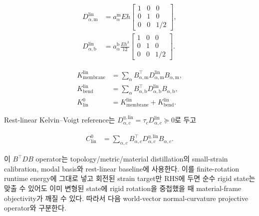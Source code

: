 \documentclass[11pt,a4paper]{article}
\begin{document}
\begin{equation}
\begin{aligned}
  D_{\alpha,\mathrm m}^{\mathrm{lin}}
  &=a_\alpha^{\mathrm m}Eh
  \begin{bmatrix}
    1&0&0\\
    0&1&0\\
    0&0&1/2
  \end{bmatrix},\\
  D_{\alpha,\mathrm{b}}^{\mathrm{lin}}
  &=a_\alpha^{\mathrm{b}}\frac{Eh^3}{12}
  \begin{bmatrix}
    1&0&0\\
    0&1&0\\
    0&0&1/2
  \end{bmatrix}.
  \label{eq:relation-constitutive-matrices}
\end{aligned}
\end{equation}

\begin{equation}
\begin{aligned}
  K_{\mathrm{membrane}}^{\mathrm{lin}}
  &=\sum_\alpha B_{\alpha,\mathrm m}^\top
    D_{\alpha,\mathrm m}^{\mathrm{lin}}B_{\alpha,\mathrm m},\\
  K_{\mathrm{bend}}^{\mathrm{lin}}
  &=\sum_\alpha B_{\alpha,\mathrm{b}}^\top
    D_{\alpha,\mathrm{b}}^{\mathrm{lin}}B_{\alpha,\mathrm{b}},\\
  K_{\mathrm{lin}}^0
  &=K_{\mathrm{membrane}}^{\mathrm{lin}}
    +K_{\mathrm{bend}}^{\mathrm{lin}}.
  \label{eq:exact-positive-stiffness-assembly}
\end{aligned}
\end{equation}

Rest-linear Kelvin--Voigt reference는
\(D_{\alpha,c}^{\eta,\mathrm{lin}}
=\tau_cD_{\alpha,c}^{\mathrm{lin}}\succeq0\)로 두고

\begin{equation}
\begin{aligned}
  C_{\mathrm{lin}}^0
  &=\sum_{\alpha,c}B_{\alpha,c}^\top
    D_{\alpha,c}^{\eta,\mathrm{lin}}B_{\alpha,c}.
  \label{eq:exact-positive-damping-assembly}
\end{aligned}
\end{equation}

이 \(B^\top DB\) operator는 topology/metric/material distillation의
small-strain calibration, modal basis와 rest-linear baseline에 사용한다.
이를 finite-rotation runtime energy에 그대로 넣고 회전된 strain target만 RHS에 두면
순수 rigid state는 맞출 수 있어도 이미 변형된 state에 rigid rotation을 중첩했을 때
material-frame objectivity가 깨질 수 있다. 따라서 다음 world-vector normal-curvature projective operator와 구분한다.
\end{document}
